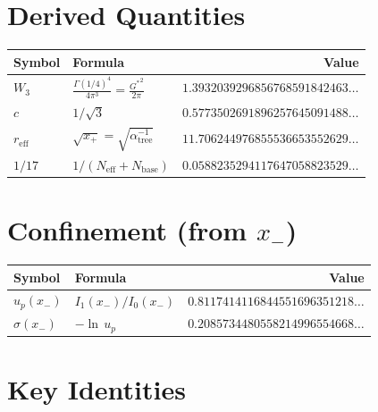 \documentclass[11pt,a4paper]{article}
\newcommand{\Gstar}{{G^{*}}}
\begin{document}
\medskip

\section*{Derived Quantities}

\begin{longtable}{lp{5.5cm}r}
\toprule
\textbf{Symbol} & \textbf{Formula} & \textbf{Value} \\
\midrule
\endhead
$W_3$ & $\displaystyle\frac{\Gamma(1/4)^4}{4\pi^3} = \frac{\Gstar^2}{2\pi}$ &
$1.3932039296856768591842463\ldots$ \\[8pt]
$c$ & $1/\sqrt{3}$ &
$0.5773502691896257645091488\ldots$ \\[4pt]
$r_{\mathrm{eff}}$ & $\sqrt{x_+} = \sqrt{\alpha_{\mathrm{tree}}^{-1}}$ &
$11.706244976855536653552629\ldots$ \\[4pt]
$1/17$ & $1/(N_{\mathrm{eff}} + N_{\mathrm{base}})$ &
$0.0588235294117647058823529\ldots$ \\
\bottomrule
\end{longtable}

\section*{Confinement (from $x_-$)}

\begin{longtable}{lp{5.5cm}r}
\toprule
\textbf{Symbol} & \textbf{Formula} & \textbf{Value} \\
\midrule
\endhead
$u_p(x_-)$ & $I_1(x_-)/I_0(x_-)$ &
$0.8117414116844551696351218\ldots$ \\[4pt]
$\sigma(x_-)$ & $-\ln\,u_p$ &
$0.2085734480558214996554668\ldots$ \\
\bottomrule
\end{longtable}

\section*{Key Identities}
\end{document}

